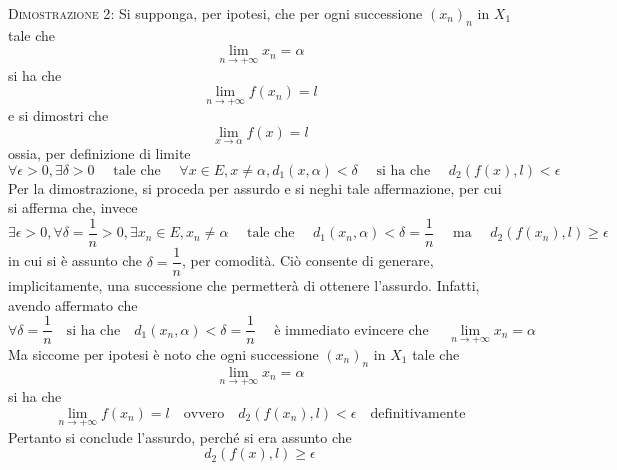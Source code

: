 \documentclass[a4paper]{extarticle}
\begin{document}
\vspace{2em}
\noindent
\normalfont \normalsize
\textsc{Dimostrazione 2}: Si supponga, per ipotesi, che per ogni successione $(x_n)_n$ in $X_1$ tale che
\[\lim_{n \to +\infty} x_n = \alpha\]
si ha che
\[\lim_{n \to +\infty} f(x_n) = l\]
e si dimostri che
\[\lim_{x \to \alpha} f(x) = l\]
ossia, per definizione di limite
\[\forall \epsilon > 0, \exists \delta > 0 \hspace{1em} \text{ tale che } \hspace{1em} \forall x \in E, x \neq \alpha, d_1(x,\alpha)<\delta \hspace{1em} \text{ si ha che } \hspace{1em} d_2(f(x),l) < \epsilon\]
Per la dimostrazione, si proceda per assurdo e si neghi tale affermazione, per cui si afferma che, invece
\[\exists \epsilon > 0, \forall \delta = \frac{1}{n} > 0, \exists x_n \in E, x_n \neq \alpha \hspace{1em} \text{ tale che } \hspace{1em} d_1(x_n,\alpha)<\delta=\frac{1}{n} \hspace{1em} \text{ ma } \hspace{1em} d_2(f(x_n),l) \geq \epsilon\]
in cui si è assunto che $\delta=\dfrac{1}{n}$, per comodità. Ciò consente di generare, implicitamente, una successione che permetterà di ottenere l'assurdo. Infatti, avendo affermato che
\[\forall \delta = \dfrac{1}{n} \hspace{1em} \text{si ha che} \hspace{1em} d_1(x_n,\alpha)<\delta=\frac{1}{n} \hspace{1em} \text{ è immediato evincere che } \hspace{1em} \lim_{n \to +\infty} x_n = \alpha\]
Ma siccome per ipotesi è noto che ogni successione $(x_n)_n$ in $X_1$ tale che
\[\lim_{n \to +\infty} x_n = \alpha\]
si ha che
\[\lim_{n \to +\infty} f(x_n) = l \hspace{1em} \text{ovvero} \hspace{1em} d_2(f(x_n),l) < \epsilon \hspace{1em} \text{definitivamente}\]
Pertanto si conclude l'assurdo, perché si era assunto che 
\[d_2(f(x),l) \geq \epsilon\]
\end{document}
